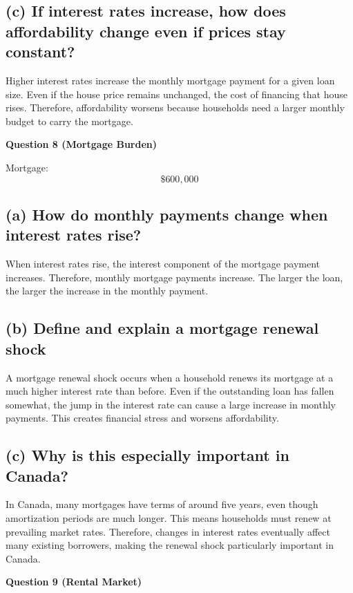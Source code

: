 \documentclass[12pt]{article}
\begin{document}
\subsection*{(c) If interest rates increase, how does affordability change even if prices stay constant?}

Higher interest rates increase the monthly mortgage payment for a given loan size. Even if the house price remains unchanged, the cost of financing that house rises. Therefore, affordability worsens because households need a larger monthly budget to carry the mortgage.

\textbf{Question 8 (Mortgage Burden)}

Mortgage:
\[
\$600{,}000
\]

\subsection*{(a) How do monthly payments change when interest rates rise?}

When interest rates rise, the interest component of the mortgage payment increases. Therefore, monthly mortgage payments increase. The larger the loan, the larger the increase in the monthly payment.

\subsection*{(b) Define and explain a mortgage renewal shock}

A mortgage renewal shock occurs when a household renews its mortgage at a much higher interest rate than before. Even if the outstanding loan has fallen somewhat, the jump in the interest rate can cause a large increase in monthly payments. This creates financial stress and worsens affordability.

\subsection*{(c) Why is this especially important in Canada?}

In Canada, many mortgages have terms of around five years, even though amortization periods are much longer. This means households must renew at prevailing market rates. Therefore, changes in interest rates eventually affect many existing borrowers, making the renewal shock particularly important in Canada.

\textbf{Question 9 (Rental Market)}
\end{document}
